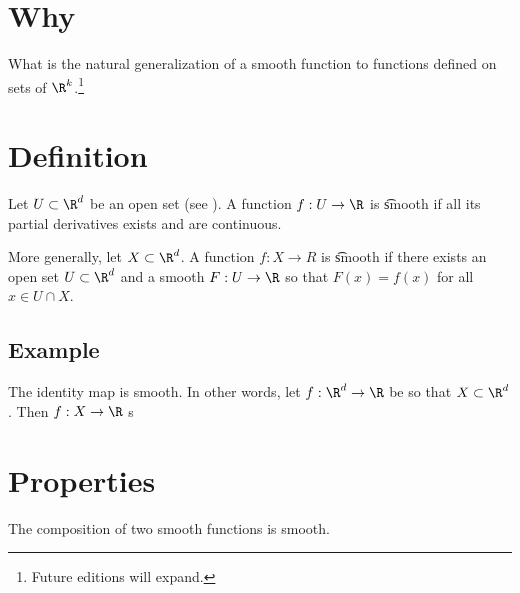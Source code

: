 
\section*{Why}

What is the natural generalization of a smooth function to functions defined on sets of $\R ^k$.\footnote{Future editions will expand.}

\section*{Definition}

Let $U \subset \R ^d$ be an open set (see ).
A function $f: U \to \R $ is \t{smooth} if all its partial derivatives exists and are continuous.

More generally, let $X \subset \R ^d$.
A function $f: X \to R$ is \t{smooth} if there exists an open set $U \subset \R ^d$ and a smooth $F: U \to \R $ so that $F(x) = f(x)$ for all $x \in U \cap  X$.

\subsection*{Example}

The identity map is smooth.
In other words, let $f: \R ^d \to \R $ be so that $X \subset \R ^d$.
Then $f: X \to \R $ s

\section*{Properties}

\begin{proposition}
The composition of two smooth functions is smooth.
\end{proposition}

\blankpage